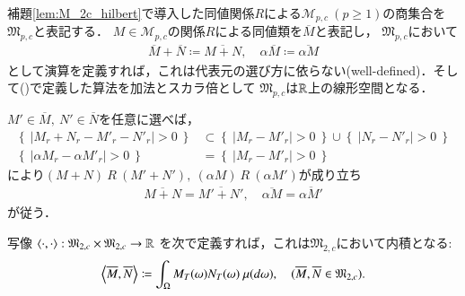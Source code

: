 	\begin{screen}
		\begin{lem}
			補題\ref{lem:M_2c_hilbert}で導入した同値関係$R$による$\mathcal{M}_{p,c}\ (p \geq 1)$の商集合を$\mathfrak{M}_{p,c}$と表記する．
			$M \in \mathcal{M}_{p,c}$の関係$R$による同値類を$\overline{M}$と表記し，
			$\mathfrak{M}_{p,c}$において
			\begin{align}
				\overline{M} + \overline{N} \coloneqq \overline{M+N}, \quad \alpha \overline{M} \coloneqq \overline{\alpha M} \label{eq:mart_linear_arithmetic}
			\end{align}
			として演算を定義すれば，これは代表元の選び方に依らない(well-defined)．そして()で定義した算法を加法とスカラ倍として
			$\mathfrak{M}_{p,c}$は$\mathbb{R}$上の線形空間となる．
		\end{lem}
	\end{screen}
	
	\begin{prf}
		$M' \in \overline{M},\ N' \in \overline{N}$を任意に選べば，
		\begin{align}
			\left\{\ \left|M_r + N_r - M'_r - N'_r \right| > 0\ \right\} &\subset \left\{\ \left|M_r - M'_r \right| > 0\ \right\} \cup \left\{\ \left|N_r - N'_r \right| > 0\ \right\} \\
			\left\{\ \left|\alpha M_r - \alpha M'_r \right| > 0\ \right\} &= \left\{\ \left|M_r - M'_r \right| > 0\ \right\}
		\end{align}
		により$(M+N)\ R\ (M'+N'),\ (\alpha M)\ R\ (\alpha M')$が成り立ち
		\begin{align}
			\overline{M+N} = \overline{M'+N'}, \quad \overline{\alpha M} = \overline{\alpha M'}
		\end{align}
		が従う．
		\QED
	\end{prf}
	
	\begin{screen}
		\begin{lem}
			写像\footnotemark
			$\inprod<\cdot,\cdot>:\mathfrak{M}_{2,c} \times \mathfrak{M}_{2,c} \rightarrow \R$
			を次で定義すれば，これは$\mathfrak{M}_{2,c}$において内積となる:
			\begin{align}
				\inprod<\overline{M},\overline{N}> \coloneqq \int_{\Omega} M_T(\omega)N_T(\omega)\ \mu(d\omega), \quad (\overline{M},\overline{N} \in \mathfrak{M}_{2,c}).
				\label{eq:M_2c_inner_product}
			\end{align}
			\label{lem:M_2c_hilbert_inner_product}
		\end{lem}
	\end{screen}
			
